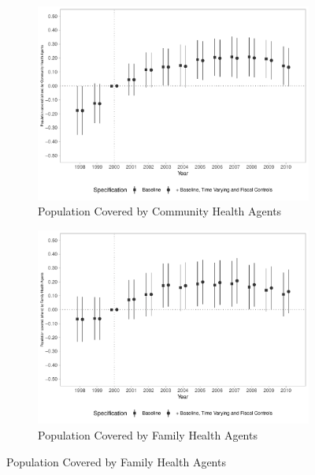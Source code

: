 \begin{figure}[h!]
    \begin{center}
    \caption{Effects on Primary Care Coverage - Extensive Margin}\label{fig:11}
    \begin{subfigure}{0.48\textwidth}
        \centering
        \caption{\scriptsize Population Covered by Community Health Agents}\label{fig:11a}
        \includegraphics[width=\textwidth]{plots/ACS_popprop_dist_ec29_baseline_dist_ec29_baseline_11.pdf}
    \end{subfigure}
    \begin{subfigure}{0.48\textwidth}
        \centering
        \caption{\scriptsize Population Covered by Family Health Agents}\label{fig:1b}
        \includegraphics[width=\textwidth]{plots/eSF_popprop_dist_ec29_baseline_dist_ec29_baseline_11.pdf}
    \end{subfigure}
    
    \end{center}
    
\end{figure}